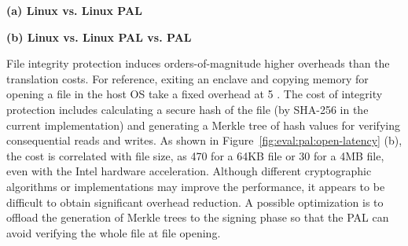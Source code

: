 \begin{figure*}[t!]
\centering
\footnotesize
{}
\parbox{0.49\textwidth}{\centering\bf (a) Linux vs. Linux PAL}
\parbox{0.49\textwidth}{\centering\bf (b) Linux vs. Linux PAL vs. \sgx{} PAL}
\caption{Latency of  on the Linux PAL  and \sgx{} PAL, versus  on Linux.
Lower is better.
Figure (a) compares  on the Linux PAL,
with and without a \seccomp{} filter ({\bf +SC})
and reference monitor ({\bf +RM}), against  on Linux. Figure (b) compares  on a \sgx{} PAL,
with and without integrity checks ({\bf +CHK}),
against the Linux PAL and  on Linux.}
\label{fig:eval:pal:open-latency}
\end{figure*}


File integrity protection induces
orders-of-magnitude higher overheads than the translation costs.
For reference,
exiting an enclave and copying memory for opening a file in the host OS take a fixed overhead
at \roughly{}5 \usec{}.
The cost of integrity protection
includes
calculating a secure hash of the file (by SHA-256 in the current implementation)
and generating a Merkle tree of hash values
for verifying
consequential reads and writes.
As shown in Figure~\ref{fig:eval:pal:open-latency} (b),
the cost is correlated with file size,
as \roughly{}470\usec{} for a 64KB file or \roughly{}30 \msec{} for a 4MB file,
even with the Intel hardware acceleration.
Although different cryptographic algorithms or implementations
may improve the performance,
it appears to be difficult to obtain significant overhead reduction.
A possible optimization
is to offload the generation of Merkle trees to the signing phase so that the PAL can avoid verifying the whole file at file opening.





